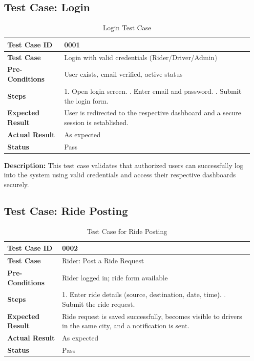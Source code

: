 \subsection{Test Case: Login}

\begin{table}[H]
\centering

\label{tab:testcase-login}
\renewcommand{\arraystretch}{1.2}
\begin{tabular}{|>{\bfseries}l|p{10cm}|}
\hline
Test Case ID & 0001 \\ \hline
Test Case & Login with valid credentials (Rider/Driver/Admin) \\ \hline
Pre-Conditions & User exists, email verified, active status \\ \hline
Steps &
1. Open login screen. \newline
2. Enter email and password. \newline
3. Submit the login form. \\ \hline
Expected Result & User is redirected to the respective dashboard and a secure session is established. \\ \hline
Actual Result & As expected \\ \hline
Status & Pass \\ \hline
\end{tabular}
\caption{Login Test Case}
\end{table}

\noindent
\textbf{Description:} This test case validates that authorized users can successfully log into the system using valid credentials and access their respective dashboards securely.




\subsection{Test Case: Ride Posting}

\begin{table}[H]
\centering
\label{tab:testcase-ride-post}
\renewcommand{\arraystretch}{1.2}
\begin{tabular}{|>{\bfseries}l|p{10cm}|}
\hline
Test Case ID & 0002 \\ \hline
Test Case & Rider: Post a Ride Request \\ \hline
Pre-Conditions & Rider logged in; ride form available \\ \hline
Steps &
1. Enter ride details (source, destination, date, time). \newline
2. Submit the ride request. \\ \hline
Expected Result & Ride request is saved successfully, becomes visible to drivers in the same city, and a notification is sent. \\ \hline
Actual Result & As expected \\ \hline
Status & Pass \\ \hline
\end{tabular}
\caption{Test Case for Ride Posting}
\end{table}

